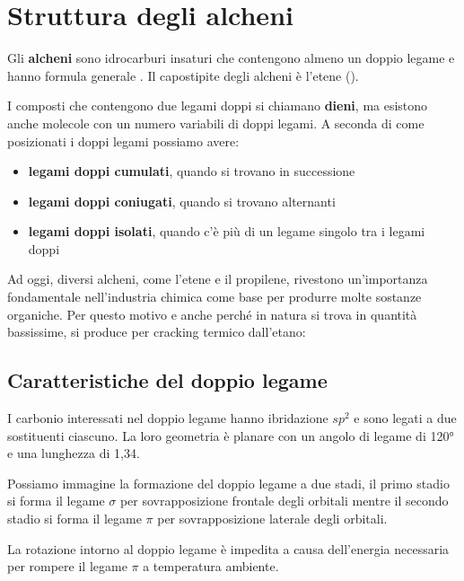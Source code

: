 \section{Struttura degli alcheni}\label{sec:strAlcheni}
Gli \textbf{alcheni} sono idrocarburi insaturi che contengono almeno un doppio legame e hanno formula generale . Il capostipite degli alcheni è l'etene ().

I composti che contengono due legami doppi si chiamano \textbf{dieni}, ma esistono anche molecole con un numero variabili di doppi legami. A seconda di come posizionati i doppi legami possiamo avere:
\begin{itemize}
	\item \textbf{legami doppi cumulati}, quando si trovano in successione
	\item \textbf{legami doppi coniugati}, quando si trovano alternanti
	\item \textbf{legami doppi isolati}, quando c'è più di un legame singolo tra i legami doppi
\end{itemize}

\begin{center}
	 \qquad {} \qquad {}
\end{center}

Ad oggi, diversi alcheni, come l'etene e il propilene, rivestono un'importanza fondamentale nell'industria chimica come base per produrre molte sostanze organiche. Per questo motivo e anche perché in natura si trova in quantità bassissime, si produce per cracking termico dall'etano:

\begin{reactions}
\end{reactions}

\subsection{Caratteristiche del doppio legame}
I carbonio interessati nel doppio legame hanno ibridazione \(sp^2\) e sono legati a due sostituenti ciascuno. La loro geometria è planare con un angolo di legame di \ang{120} e una lunghezza di 1,34\angstrom.

Possiamo immagine la formazione del doppio legame a due stadi, il primo stadio si forma il legame \(\sigma\) per sovrapposizione frontale degli orbitali mentre il secondo stadio si forma il legame \(\pi\) per sovrapposizione laterale degli orbitali.

La rotazione intorno al doppio legame è impedita a causa dell'energia necessaria per rompere il legame \(\pi\) a temperatura ambiente.

